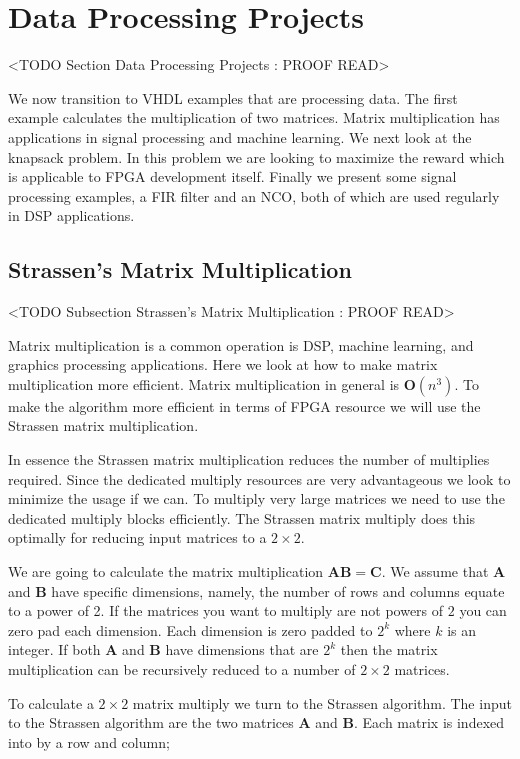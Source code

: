 \section{Data Processing Projects}
	<TODO Section Data Processing Projects : PROOF READ>
	
We now transition to \ac{VHDL} examples that are processing data. The first example calculates the multiplication of two matrices. Matrix multiplication has applications in signal processing and machine learning. We next look at the knapsack problem. In this problem we are looking to maximize the reward which is applicable to \ac{FPGA} development itself. Finally we present some signal processing examples, a \ac{FIR} filter and an \ac{NCO}, both of which are used regularly in \ac{DSP} applications. 

\subsection{Strassen's Matrix Multiplication}
	<TODO Subsection Strassen's Matrix Multiplication : PROOF READ>
	
Matrix multiplication is a common operation is \ac{DSP}, machine learning, and graphics processing applications. Here we look at how to make matrix multiplication more efficient. Matrix multiplication in general is $\mathbf{O}(n^3)$. To make the algorithm more efficient in terms of \ac{FPGA} resource we will use the Strassen matrix multiplication. 

In essence the Strassen matrix multiplication reduces the number of multiplies required. Since the dedicated multiply resources are very advantageous we look to minimize the usage if we can. To multiply very large matrices we need to use the dedicated multiply blocks efficiently. The Strassen matrix multiply does this optimally for reducing input matrices to a $2 \times 2$.

We are going to calculate the matrix multiplication $\mathbf{A}\mathbf{B}=\mathbf{C}$. We assume that $\mathbf{A}$ and $\mathbf{B}$ have specific dimensions, namely, the number of rows and columns equate to a power of 2. If the matrices you want to multiply are not powers of $2$ you can zero pad each dimension. Each dimension is zero padded to $2^k$ where $k$ is an integer. If both $\mathbf{A}$ and $\mathbf{B}$ have dimensions that are $2^k$ then the matrix multiplication can be recursively reduced to a number of $2 \times 2$ matrices. 

To calculate a $2 \times 2$ matrix multiply we turn to the Strassen algorithm. The input to the Strassen algorithm are the two matrices $\mathbf{A}$ and $\mathbf{B}$. Each matrix is indexed into by a row and column;

